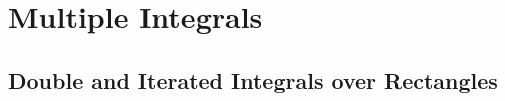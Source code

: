 \documentclass{article}
\begin{document}
    \newpage
    \section{Multiple Integrals}
        \subsection{Double and Iterated Integrals over Rectangles}
\end{document}
